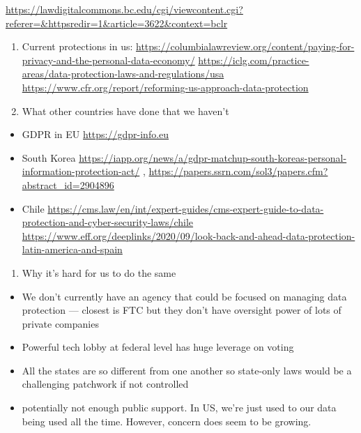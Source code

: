 \documentclass[water,article,submit,moreauthors,pdftex]{mdpi}
\providecommand{\tightlist}{%
  \setlength{\itemsep}{0pt}\setlength{\parskip}{4pt}}
\begin{document}
\url{https://lawdigitalcommons.bc.edu/cgi/viewcontent.cgi?referer=\&httpsredir=1\&article=3622\&context=bclr}

\begin{enumerate}
\def\labelenumi{\arabic{enumi}.}
\setcounter{enumi}{3}
\item
  Current protections in us:
  \url{https://columbialawreview.org/content/paying-for-privacy-and-the-personal-data-economy/}
  \url{https://iclg.com/practice-areas/data-protection-laws-and-regulations/usa}
  \url{https://www.cfr.org/report/reforming-us-approach-data-protection}
\item
  What other countries have done that we haven't
\end{enumerate}

\begin{itemize}
\tightlist
\item
  GDPR in EU \url{https://gdpr-info.eu}
\item
  South Korea
  \url{https://iapp.org/news/a/gdpr-matchup-south-koreas-personal-information-protection-act/}
  , \url{https://papers.ssrn.com/sol3/papers.cfm?abstract_id=2904896}
\item
  Chile
  \url{https://cms.law/en/int/expert-guides/cms-expert-guide-to-data-protection-and-cyber-security-laws/chile}
  \url{https://www.eff.org/deeplinks/2020/09/look-back-and-ahead-data-protection-latin-america-and-spain}
\end{itemize}

\begin{enumerate}
\def\labelenumi{\arabic{enumi}.}
\setcounter{enumi}{4}
\tightlist
\item
  Why it's hard for us to do the same
\end{enumerate}

\begin{itemize}
\tightlist
\item
  We don't currently have an agency that could be focused on managing
  data protection --- closest is FTC but they don't have oversight power
  of lots of private companies
\item
  Powerful tech lobby at federal level has huge leverage on voting
\item
  All the states are so different from one another so state-only laws
  would be a challenging patchwork if not controlled
\item
  potentially not enough public support. In US, we're just used to our
  data being used all the time. However, concern does seem to be
  growing.
\end{itemize}
\end{document}
